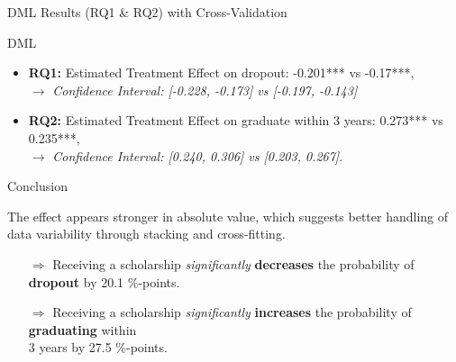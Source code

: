 \documentclass[aspectratio=169]{beamer}
\begin{document}
\begin{frame}{DML Results (RQ1 \& RQ2) with Cross-Validation}

\vspace{10pt}
\begin{alertblock}{DML}
	\begin{itemize}[label=--,itemsep=1pt,topsep=2pt]
	\item \textbf{RQ1:} Estimated Treatment Effect on dropout: -0.201*** vs -0.17***,\\ $\rightarrow$ \textit{Confidence Interval: [-0.228, -0.173] vs [-0.197, -0.143]}
	\item \textbf{RQ2:} Estimated Treatment Effect on graduate within 3 years:  0.273*** vs 0.235***,\\ 
    $\rightarrow$ \textit{Confidence Interval: [0.240, 0.306] vs [0.203, 0.267]}.
	
\end{itemize}
\end{alertblock}
\vspace{3pt}

\begin{exampleblock}{Conclusion}

The effect appears stronger in absolute value, which suggests better handling of data variability through stacking and cross-fitting. \\
\vspace{-4pt}
\begin{itemize}[label=--, itemsep=1pt]
    \item [$\Rightarrow$]Receiving a scholarship \textit{significantly} \textbf{decreases} the probability of \textbf{dropout} by 20.1 \%-points.
    \item [$\Rightarrow$]Receiving a scholarship \textit{significantly} \textbf{increases} the probability of \textbf{graduating} within \\ 3 years by 27.5 \%-points.
\end{itemize}
\vspace{-3pt}
	
\end{exampleblock}

    
\end{frame}
\end{document}
